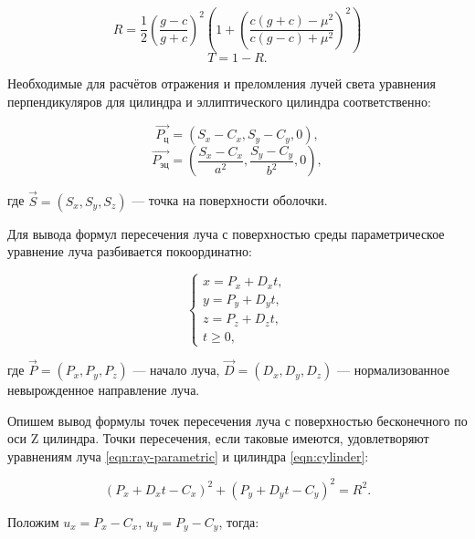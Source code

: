 \begin{equation}
	R = \frac12 \left(\frac{g-c}{g+c}\right)^2 \left(1 + \left(\frac{c(g + c) - \mu^2}{c(g - c) + \mu^2}\right)^2\right)
\end{equation}
\begin{equation}
	\label{eqn:refraction-end}
	T = 1 - R.
\end{equation}

Необходимые для расчётов отражения и преломления лучей света уравнения перпендикуляров для цилиндра и эллиптического цилиндра соответственно:

\begin{equation}
	\label{eqn:perpendicular-cylinder}
	\overrightarrow{P_{\text{ц}}} = (S_x - C_x, S_y - C_y, 0),
\end{equation}
\begin{equation}
	\label{eqn:perpendicular-elliptic-cylinder}
	\overrightarrow{P_{\text{эц}}} = \left(\frac{S_x - C_x}{a^2}, \frac{S_y - C_y}{b^2}, 0\right),
\end{equation}

где $\vec S = \left(S_x, S_y, S_z\right)$ — точка на поверхности оболочки.

Для вывода формул пересечения луча с поверхностью среды параметрическое уравнение луча разбивается покоординатно:

\begin{equation}
	\label{eqn:ray-parametric}
	\begin{cases}
		x = P_x + D_x t, \\
		y = P_y + D_y t, \\
		z = P_z + D_z t, \\
		t \geqslant 0,
	\end{cases}
\end{equation}

\noindent где $\vec P = (P_x, P_y, P_z)$ — начало луча, $\vec D = (D_x, D_y, D_z)$ — нормализованное невырожденное направление луча.

Опишем вывод формулы точек пересечения луча с поверхностью бесконечного по оси Z цилиндра. Точки пересечения, если таковые имеются, удовлетворяют уравнениям луча \eqref{eqn:ray-parametric} и цилиндра \eqref{eqn:cylinder}:

\begin{equation}
	\label{eqn:cylinder-solve-begin}
	(P_x + D_x t - C_x)^2 + (P_y + D_y t - C_y)^2 = R^2.
\end{equation}

\noindent Положим $u_x = P_x - C_x$, $u_y = P_y - C_y$, тогда:

